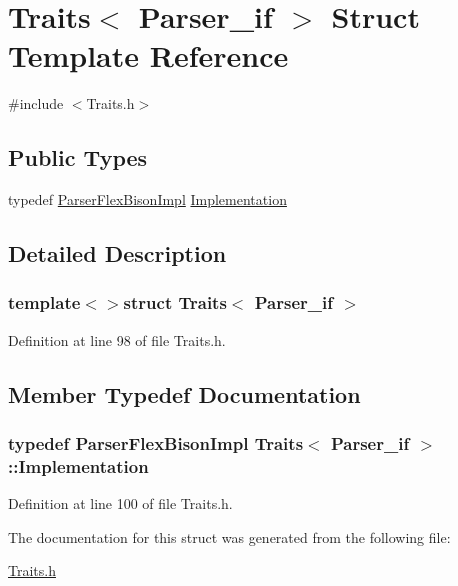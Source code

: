 \hypertarget{struct_traits_3_01_parser__if_01_4}{\section{Traits$<$ Parser\-\_\-if $>$ Struct Template Reference}
\label{struct_traits_3_01_parser__if_01_4}
}


{\ttfamily \#include $<$Traits.\-h$>$}

\subsection*{Public Types}
\begin{DoxyCompactItemize}
\item 
typedef \hyperlink{class_parser_flex_bison_impl}{Parser\-Flex\-Bison\-Impl} \hyperlink{struct_traits_3_01_parser__if_01_4_ac4b3058438c07381c066f9a376c01b05}{Implementation}
\end{DoxyCompactItemize}


\subsection{Detailed Description}
\subsubsection*{template$<$$>$struct Traits$<$ Parser\-\_\-if $>$}



Definition at line 98 of file Traits.\-h.



\subsection{Member Typedef Documentation}
\hypertarget{struct_traits_3_01_parser__if_01_4_ac4b3058438c07381c066f9a376c01b05}{
\subsubsection[{Implementation}]{\setlength{\rightskip}{0pt plus 5cm}typedef {\bf Parser\-Flex\-Bison\-Impl} {\bf Traits}$<$ {\bf Parser\-\_\-if} $>$\-::{\bf Implementation}}}\label{struct_traits_3_01_parser__if_01_4_ac4b3058438c07381c066f9a376c01b05}


Definition at line 100 of file Traits.\-h.



The documentation for this struct was generated from the following file\-:\begin{DoxyCompactItemize}
\item 
\hyperlink{_traits_8h}{Traits.\-h}\end{DoxyCompactItemize}

